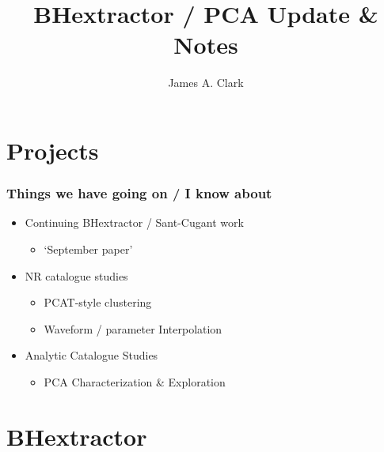 \documentclass{beamer}
\begin{document}
\title{BHextractor / PCA Update \& Notes}
\author{James A. Clark}
\date{} 

\begin{frame}[plain]
\titlepage
\end{frame}


\section{Projects}

\begin{frame}

    \frametitle{Things we have going on / I know about}
    \begin{itemize}
        \item Continuing BHextractor / Sant-Cugant work
            \begin{itemize} 
                \item `September paper'
            \end{itemize}
        \item NR catalogue studies
            \begin{itemize} 
                \item PCAT-style clustering
                \item Waveform / parameter Interpolation
            \end{itemize}
        \item Analytic Catalogue Studies
            \begin{itemize}
                \item PCA Characterization \& Exploration 
            \end{itemize}
    \end{itemize}

\end{frame}

\section{BHextractor}
\end{document}
